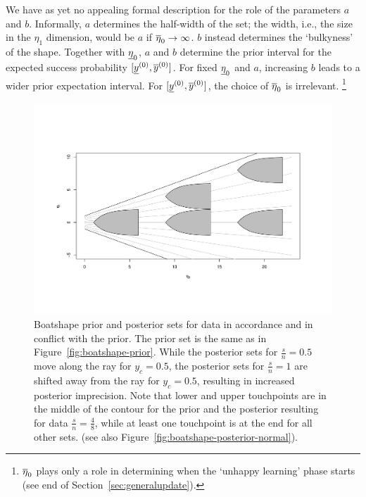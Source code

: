 We have as yet no appealing formal description for the role of the parameters $a$ and $b$. %
Informally, $a$ determines the half-width of the set;
the width, i.e., the size in the $\eta_1$ dimension, would be $a$ if $\overline{\eta}_0 \to \infty$.
$b$ instead determines the `bulkyness' of the shape.
Together with $\underline{\eta}_0$, $a$ and $b$ determine the prior interval for the expected success probability $[\underline{y}^{(0)}, \overline{y}^{(0)}]$.
For fixed $\underline{\eta}_0$ and $a$, increasing $b$ leads to a wider prior expectation interval.
For $[\underline{y}^{(0)}, \overline{y}^{(0)}]$, the choice of $\overline{\eta}_0$ is irrelevant.%
\footnote{$\overline{\eta}_0$ plays only a role in determining when the `unhappy learning' phase starts
(see end of Section~\ref{sec:generalupdate}).}


\begin{figure}  %
\centering
\includegraphics[trim = 20mm 35mm 30mm 45mm, clip, width=\textwidth]{R/boatshape-posterior-mik}%
\caption[Boatshape prior and posterior sets for data in accordance and in conflict with the prior.]%
{Boatshape prior and posterior sets for data in accordance and in conflict with the prior.
The prior set is the same as in Figure~\ref{fig:boatshape-prior}.
While the posterior sets for $\frac{s}{n}=0.5$ move along the ray for $y_c=0.5$,
the posterior sets for $\frac{s}{n}=1$ are shifted away from the ray for $y_c=0.5$,
resulting in increased posterior imprecision.
Note that lower and upper touchpoints are in the middle of the contour
for the prior and the posterior resulting for data $\frac{s}{n}=\frac{4}{8}$,
while at least one touchpoint is at the end for all other sets.
(see also Figure~\ref{fig:boatshape-posterior-normal}).}
\label{fig:boatshape-posterior-mik}
\end{figure}


